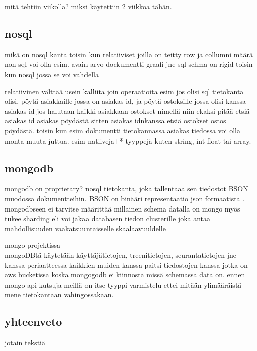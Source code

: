 
mitä tehtiin viikolla?
miksi käytettiin 2 viikkoa tähän.



\subsection*{nosql}
mikä on nosql kanta
toisin kun relatiiviset joilla on teitty row ja collumni määrä non sql voi olla esim. avain-arvo dockumentti graafi jne
sql schma on rigid toisin kun nosql jossa se voi vahdella

relatiivinen välttää usein kalliita join operaatioita
esim jos olisi sql tietokanta olisi, pöytä asiakkaille jossa on asiakas id, ja pöytä ostoksille jossa olisi kanssa asiakas id
jos halutaan kaikki asiakkaan ostokset nimellä niin ekaksi pitää etsiä asiakas id asiakas pöydästä sitten asiakas idnkanssa etsiä ostokset ostos pöydästä.
toisin kun esim dokumentti tietokannassa asiakas tiedossa voi olla monta muuta juttua. esim natiiveja+* tyyppejä kuten string, int float tai array.


\subsection*{mongodb}

mongodb on proprietary? nosql tietokanta, joka tallentaaa sen tiedostot BSON muodossa dokumentteihin. BSON on binääri representaatio json formaatista .
mongodbseen ei tarvitse määrittää millainen schema datalla on
mongo myös tukee sharding eli voi jakaa databasen tiedon clusterille joka antaa mahdollisuuden vaakatsuuntaisselle skaalaavuuldelle


mongo projektissa\\
mongoDBtä käytetään käyttäjätietojen, treenitietojen, seurantatietojen jne kanssa
periaatteessa kaikkien muiden kanssa paitsi tiedostojen kanssa jotka on aws bucketissa
koska mongogodb ei kiinnosta missä schemassa data on. ennen mongo api kutsuja meillä on itse tyyppi varmistelu ettei mitään ylimääräistä mene tietokantaan vahingossakaan.



\subsection*{yhteenveto}
jotain tekstiä
